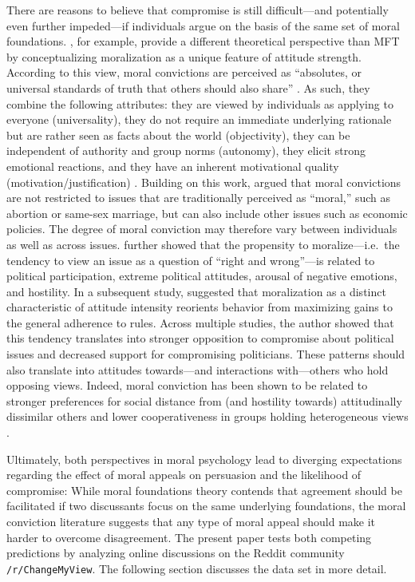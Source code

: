 \documentclass[12pt,]{article}
\begin{document}
There are reasons to believe that compromise is still difficult---and
potentially even further impeded---if individuals argue on the basis of
the same set of moral foundations. \citet{skitka2005moral}, for example,
provide a different theoretical perspective than MFT by conceptualizing
moralization as a unique feature of attitude strength. According to this
view, moral convictions are perceived as ``absolutes, or universal
standards of truth that others should also share''
\citep[269]{skitka2010psychology}. As such, they combine the following
attributes: they are viewed by individuals as applying to everyone
(universality), they do not require an immediate underlying rationale
but are rather seen as facts about the world (objectivity), they can be
independent of authority and group norms (autonomy), they elicit strong
emotional reactions, and they have an inherent motivational quality
(motivation/justification) \citep{skitka2010psychology}. Building on
this work, \citet{ryan2014reconsidering} argued that moral convictions
are not restricted to issues that are traditionally perceived as
``moral,'' such as abortion or same-sex marriage, but can also include
other issues such as economic policies. The degree of moral conviction
may therefore vary between individuals as well as across issues.
\citet{ryan2014reconsidering} further showed that the propensity to
moralize---i.e.~the tendency to view an issue as a question of ``right
and wrong''---is related to political participation, extreme political
attitudes, arousal of negative emotions, and hostility. In a subsequent
study, \citet{ryan2016no} suggested that moralization as a distinct
characteristic of attitude intensity reorients behavior from maximizing
gains to the general adherence to rules. Across multiple studies, the
author showed that this tendency translates into stronger opposition to
compromise about political issues and decreased support for compromising
politicians. These patterns should also translate into attitudes
towards---and interactions with---others who hold opposing views.
Indeed, moral conviction has been shown to be related to stronger
preferences for social distance from (and hostility towards)
attitudinally dissimilar others and lower cooperativeness in groups
holding heterogeneous views \citep{skitka2005moral}.

Ultimately, both perspectives in moral psychology lead to diverging
expectations regarding the effect of moral appeals on persuasion and the
likelihood of compromise: While moral foundations theory contends that
agreement should be facilitated if two discussants focus on the same
underlying foundations, the moral conviction literature suggests that
any type of moral appeal should make it harder to overcome disagreement.
The present paper tests both competing predictions by analyzing online
discussions on the Reddit community \texttt{/r/ChangeMyView}. The
following section discusses the data set in more detail.
\end{document}
